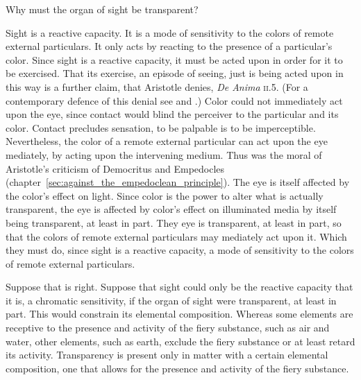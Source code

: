 Why must the organ of sight be transparent?

Sight is a reactive capacity. It is a mode of sensitivity to the colors of remote external particulars. It only acts by reacting to the presence of a particular's color. Since sight is a reactive capacity, it must be acted upon in order for it to be exercised. That its exercise, an episode of seeing, just is being acted upon in this way is a further claim, that Aristotle denies, \emph{De Anima} \textsc{ii}.5. (For a contemporary defence of this denial see \citealt{Travis:2009fk} and \citealt{Kalderon:2012fk}.) Color could not immediately act upon the eye, since contact would blind the perceiver to the particular and its color. Contact precludes sensation, to be palpable is to be imperceptible. Nevertheless, the color of a remote external particular can act upon the eye mediately, by acting upon the intervening medium. Thus was the moral of Aristotle's criticism of Democritus and Empedocles (chapter~\ref{sec:against_the_empedoclean_principle}). The eye is itself affected by the color's effect on light. Since color is the power to alter what is actually transparent, the eye is affected by color's effect on illuminated media by itself being transparent, at least in part. They eye is transparent, at least in part, so that the colors of remote external particulars may mediately act upon it. Which they must do, since sight is a reactive capacity, a mode of sensitivity to the colors of remote external particulars.

Suppose that is right. Suppose that sight could only be the reactive capacity that it is, a chromatic sensitivity, if the organ of sight were transparent, at least in part. This would constrain its elemental composition. Whereas some elements are receptive to the presence and activity of the fiery substance, such as air and water, other elements, such as earth, exclude the fiery substance or at least retard its activity. Transparency is present only in matter with a certain elemental composition, one that allows for the presence and activity of the fiery substance.

